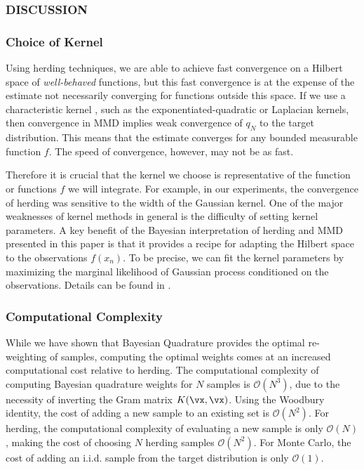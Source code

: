 \subsubsection{DISCUSSION}

\subsubsection{Choice of Kernel}

Using herding techniques, we are able to achieve fast convergence on a Hilbert space of \emph{well-behaved} functions, but this fast convergence is at the expense of the estimate not necessarily converging for functions outside this space.
If we use a characteristic kernel \citep{Sriperumbudur2008}, such as the exponentiated-quadratic or Laplacian kernels, then convergence in MMD implies weak convergence of $q_N$ to the target distribution. 
This means that the estimate converges for any bounded measurable function $f$. The speed of convergence, however, may not be as fast.

Therefore it is crucial that the kernel we choose is representative of the function or functions $f$ we will integrate.  For example, in our experiments, the convergence of herding was sensitive to the width of the Gaussian kernel.  One of the major weaknesses of kernel methods in general is the difficulty of setting kernel parameters.  A key benefit of the Bayesian interpretation of herding and MMD presented in this paper is that it provides a recipe for adapting the Hilbert space to the observations $f(x_n)$.  To be precise, we can fit the kernel parameters by maximizing the marginal likelihood of Gaussian process conditioned on the observations.  Details can be found in \citep{rasmussen38gaussian}.

\subsubsection{Computational Complexity}

While we have shown that Bayesian Quadrature provides the optimal re-weighting of samples, computing the optimal weights comes at an increased computational cost relative to herding. 
%
The computational complexity of computing Bayesian quadrature weights for $N$ samples is $\mathcal{O}(N^3)$, due to the necessity of inverting the Gram matrix $K(\vx, \vx)$.  Using the Woodbury identity, the cost of adding a new sample to an existing set is $\mathcal{O}(N^2)$.  For herding, the computational complexity of evaluating a new sample is only $\mathcal{O}(N)$, making the cost of choosing $N$ herding samples $\mathcal{O}(N^2)$.  For Monte Carlo, the cost of adding an i.i.d. sample from the target distribution is only $\mathcal{O}(1)$.

